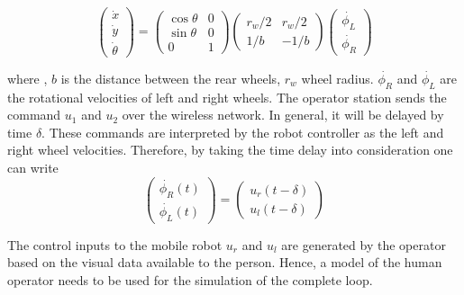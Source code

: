 \begin{equation}
\label{eqn:KinematicModelOfRobot}
\begin{pmatrix}
\dot{x}\\ 
\dot{y}\\ 
\dot{\theta}
\end{pmatrix}
=
\begin{pmatrix}
\cos \theta & 0 \\
\sin \theta & 0 \\
0& 1
\end{pmatrix}
\begin{pmatrix}
r_w/2 & r_w/2\\
1/b & -1/b
\end{pmatrix}
\begin{pmatrix}
\dot{\phi_L}\\
\dot{\phi_R}
\end{pmatrix}
\end{equation}


where ,  $b$ is the distance between the rear wheels, $r_w$ wheel radius. $\dot{\phi_R}$ and $\dot{\phi_L} $ are the rotational velocities of left and right wheels. 
The operator station sends the command $u_1$ and $u_2$ over the wireless network. In general, it will be delayed by time $\delta$. These commands are interpreted by the robot controller as the left and right wheel velocities.  Therefore, by taking the time delay into consideration one can write
\begin{equation}
\begin{pmatrix}
\dot{\phi_R}(t) \\
 \dot{\phi_L}(t)
\end{pmatrix}
=
\begin{pmatrix}
u_r(t-\delta)\\
u_l(t-\delta)
\end{pmatrix}
\end{equation}

The control inputs to the mobile robot  $u_r$ and $u_l$ are generated by the operator based on the visual data available to the person. Hence, a model of the human operator needs to be used for the simulation of the complete loop.


